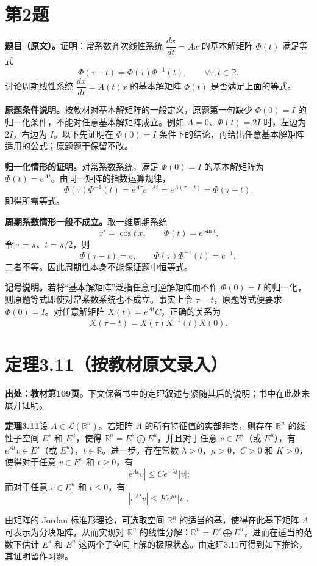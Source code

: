 \documentclass[11pt,a4paper]{ctexart}
\newcommand{\R}{\mathbb R}\newcommand{\C}{\mathbb C}
\begin{document}
\section*{第2题}
\textbf{题目（原文）。}证明：常系数齐次线性系统 $\dfrac{dx}{dt}=Ax$ 的基本解矩阵 $\Phi(t)$ 满足等式
\[
\Phi(\tau-t)=\Phi(\tau)\Phi^{-1}(t),\qquad\forall\tau,t\in\R.
\]
讨论周期线性系统 $\dfrac{dx}{dt}=A(t)x$ 的基本解矩阵 $\Phi(t)$ 是否满足上面的等式。

\textbf{原题条件说明。}按教材对基本解矩阵的一般定义，原题第一句缺少 $\Phi(0)=I$ 的归一化条件，不能对任意基本解矩阵成立。例如 $A=0$、$\Phi(t)=2I$ 时，左边为 $2I$，右边为 $I$。以下先证明在 $\Phi(0)=I$ 条件下的结论，再给出任意基本解矩阵适用的公式；原题题干保留不改。

\textbf{归一化情形的证明。}对常系数系统，满足 $\Phi(0)=I$ 的基本解矩阵为 $\Phi(t)=e^{At}$。由同一矩阵的指数运算规律，
\[
\Phi(\tau)\Phi^{-1}(t)=e^{A\tau}e^{-At}
=e^{A(\tau-t)}=\Phi(\tau-t).
\]
即得所需等式。

\textbf{周期系数情形一般不成立。}取一维周期系统
\[
x'=\cos t\,x,\qquad \Phi(t)=e^{\sin t}.
\]
令 $\tau=\pi$、$t=\pi/2$，则
\[
\Phi(\tau-t)=e,
\qquad
\Phi(\tau)\Phi^{-1}(t)=e^{-1},
\]
二者不等。因此周期性本身不能保证题中恒等式。

\textbf{记号说明。}若将“基本解矩阵”泛指任意可逆解矩阵而不作 $\Phi(0)=I$ 的归一化，则原题等式即使对常系数系统也不成立。事实上令 $\tau=t$，原题等式便要求 $\Phi(0)=I$。对任意解矩阵 $X(t)=e^{At}C$，正确的关系为
\[
X(\tau-t)=X(\tau)X^{-1}(t)X(0).
\]

\section*{定理3.11（按教材原文录入）}
\textbf{出处：教材第109页。}下文保留书中的定理叙述与紧随其后的说明；书中在此处未展开证明。

\textbf{定理3.11}\quad 设 $A\in\mathcal L(\R^n)$。若矩阵 $A$ 的所有特征值的实部非零，则存在 $\R^n$ 的线性子空间 $E^s$ 和 $E^u$，使得 $\R^n=E^s\bigoplus E^u$，并且对于任意 $v\in E^s$（或 $E^u$），有 $e^{At}v\in E^s$（或 $E^u$），$t\in\R$。进一步，存在常数 $\lambda>0$，$\mu>0$，$C>0$ 和 $K>0$，使得对于任意 $v\in E^s$ 和 $t\ge0$，有
\[
|e^{At}v|\le Ce^{-\lambda t}|v|;
\]
而对于任意 $v\in E^u$ 和 $t\le0$，有
\[
|e^{At}v|\le Ke^{\mu t}|v|.
\]

由矩阵的 Jordan 标准形理论，可选取空间 $\R^n$ 的适当的基，使得在此基下矩阵 $A$ 可表示为分块矩阵，从而实现对 $\R^n$ 的线性分解：$\R^n=E^s\bigoplus E^u$，进而在适当的范数下估计 $E^s$ 和 $E^u$ 这两个子空间上解的极限状态。由定理3.11可得到如下推论，其证明留作习题。
\end{document}
